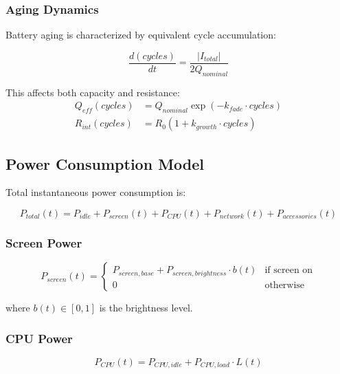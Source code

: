 \documentclass[12pt]{article}
\begin{document}
\subsubsection{Aging Dynamics}

Battery aging is characterized by equivalent cycle accumulation:

\begin{equation}
\frac{d(cycles)}{dt} = \frac{|I_{total}|}{2 Q_{nominal}}
\label{eq:aging}
\end{equation}

This affects both capacity and resistance:
\begin{align}
Q_{eff}(cycles) &= Q_{nominal} \exp(-k_{fade} \cdot cycles) \\
R_{int}(cycles) &= R_{0}(1 + k_{growth} \cdot cycles)
\end{align}

\subsection{Power Consumption Model}

Total instantaneous power consumption is:

\begin{equation}
P_{total}(t) = P_{idle} + P_{screen}(t) + P_{CPU}(t) + P_{network}(t) + P_{accessories}(t)
\label{eq:power}
\end{equation}

\subsubsection{Screen Power}

\begin{equation}
P_{screen}(t) = \begin{cases}
P_{screen,base} + P_{screen,brightness} \cdot b(t) & \text{if screen on} \\
0 & \text{otherwise}
\end{cases}
\end{equation}

where $b(t) \in [0,1]$ is the brightness level.

\subsubsection{CPU Power}

\begin{equation}
P_{CPU}(t) = P_{CPU,idle} + P_{CPU,load} \cdot L(t)
\end{equation}
\end{document}
